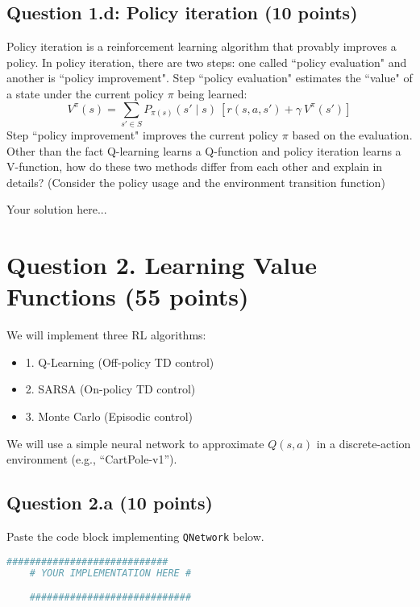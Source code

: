 \documentclass[12pt]{article}
\begin{document}
\subsection*{Question 1.d: Policy iteration (10 points)}
Policy iteration is a reinforcement learning algorithm that provably improves a policy. In policy iteration, there are two steps: one called ``policy evaluation" and another is ``policy improvement".  Step ``policy evaluation" estimates the ``value" of a state under the current policy $\pi$ being learned:
$$ V^\pi(s) =  \sum_{s' \in S} P_{\pi(s)} (s' \mid s)\ [r(s,a,s') +  \gamma\ V^\pi(s') ] $$
Step ``policy improvement" improves the current policy $\pi$ based on the evaluation. Other than the fact Q-learning learns a Q-function and policy iteration learns a V-function, how do these two methods differ from each other and explain in details? (Consider the policy usage and the environment transition function)

\begin{solution}
Your solution here...
\end{solution}

\section*{Question 2. Learning Value Functions (55 points)}
We will implement three RL algorithms:
\begin{itemize}
    \item 1. Q-Learning (Off-policy TD control)
    \item 2. SARSA (On-policy TD control)
    \item 3. Monte Carlo (Episodic control)
\end{itemize}
We will use a simple neural network to approximate $Q(s, a)$ in a discrete-action environment (e.g., ``CartPole-v1'').

\subsection*{Question 2.a (10 points)}
Paste the code block implementing \texttt{QNetwork} below.
            \begin{solution}
                \begin{lstlisting}[language=Python]
    ############################
    # YOUR IMPLEMENTATION HERE #
    
    ############################
                \end{lstlisting}
            \end{solution}
\end{document}
